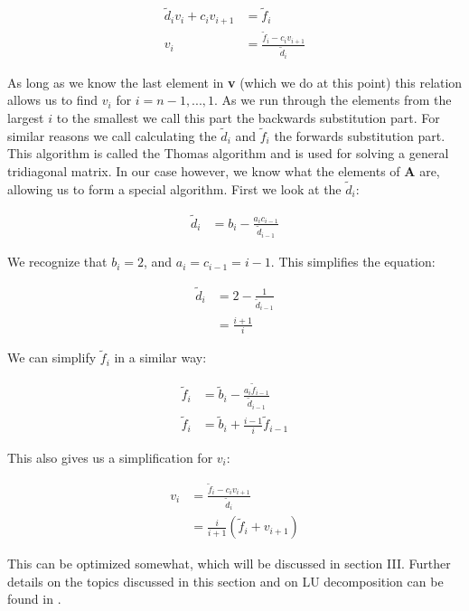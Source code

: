 \documentclass[english,notitlepage,reprint,nofootinbib]{revtex4-1}  %
\begin{document}
\begin{align*}
\tilde{d}_i v_i  + c_i v_{i+1} &= \tilde{f}_i \\
v_i &= \frac{\tilde{f}_i - c_i v_{i+1}}{\tilde{d}_i}
\end{align*}

As long as we know the last element in \textbf{v} (which we do at this point) this relation allows us to find $v_i$ for $i = n-1,...,1$. As we run through the elements from the largest $i$ to the smallest we call this part the backwards substitution part. For similar reasons we call calculating the $\tilde{d}_i$ and $\tilde{f}_i$ the forwards substitution part. This algorithm is called the Thomas algorithm \citep{Thomas1949} and is used for solving a general tridiagonal matrix. In our case however, we know what the elements of \textbf{A} are, allowing us to form a special algorithm. First we look at the $\tilde{d}_i$:

\begin{align*}
\tilde{d}_i &= b_i - \frac{a_i c_{i-1}}{\tilde{d}_{i-1}}
\end{align*}

We recognize that $b_i = 2$, and $a_i = c_{i-1} = i-1$. This simplifies the equation:

\begin{align*}
\tilde{d}_i &= 2 - \frac{1}{\tilde{d}_{i-1}} \\
&= \frac{i+1}{i}
\end{align*}

We can simplify $\tilde{f}_i$ in a similar way:

\begin{align*}
\tilde{f}_i &= \tilde{b}_i - \frac{a_i \tilde{f}_{i-1}}{\tilde{d}_{i-1}} \\
\tilde{f}_i &= \tilde{b}_i + \frac{i-1}{i}\tilde{f}_{i-1}
\end{align*}

This also gives us a simplification for $v_i$:

\begin{align*}
v_i &= \frac{\tilde{f}_i - c_i v_{i+1}}{\tilde{d}_i} \\
&= \frac{i}{i+1}(\tilde{f}_i + v_{i+1})
\end{align*}

This can be optimized somewhat, which will be discussed in section III. Further details on the topics discussed in this section and on LU decomposition can be found in \citep{Hjorth-Jensen2015}.

\newpage
\end{document}
